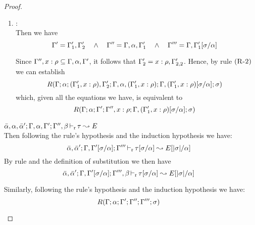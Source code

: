 \begin{proof}
\begin{description}
\begin{enumerate}
  \item {}: \\
   Then we have
\begin{equation*}
  \Gamma' = \Gamma_1',\Gamma_2'  \quad\wedge\quad \Gamma'' = \Gamma,\alpha,\Gamma_1' \quad\wedge\quad 
      \Gamma''' = \Gamma,\Gamma_1'[\sigma/\alpha]
\end{equation*}

  Since $\Gamma'',x:\rho \subseteq \Gamma,\alpha,\Gamma'$, it follows that $\Gamma_2' = x:\rho,\Gamma_{2,2}'$.
  Hence, by rule $\mbox{({\tt\sc R-2})}$ we can establish
\begin{equation*}
R(\Gamma;\alpha;(\Gamma_1',x:\rho),\Gamma_2';\Gamma,\alpha,(\Gamma_1',x:\rho);\Gamma,(\Gamma_1',x:\rho)[\sigma/\alpha];\sigma)
\end{equation*}
        which, given all the equations we have, is equivalent to
\begin{equation*}
R(\Gamma;\alpha;\Gamma';\Gamma'',x:\rho;\Gamma,(\Gamma_1',x:\rho)[\sigma/\alpha];\sigma)
\end{equation*}
  \end{enumerate}


\item[\fbox{\texttt{(L-TyVar)}}]\quad$\bar{\alpha},\alpha,\bar{\alpha}';\Gamma,\alpha,\Gamma';\Gamma'',\beta \mathop{\vdash_{\mathrm{r}}} \tau \leadsto E$ \ \\
  Then following the rule's hypothesis and the induction hypothesis we have:
\begin{equation*}
  \bar{\alpha},\bar{\alpha}';\Gamma,\Gamma'[\sigma/\alpha];\Gamma''' \mathop{\vdash_{\mathrm{r}}} \tau[\sigma/\alpha] \leadsto E[|\sigma|/\alpha]
\end{equation*}
  By rule  and the definition of substitution we then have
\begin{equation*}
  \bar{\alpha},\bar{\alpha}';\Gamma,\Gamma'[\sigma/\alpha];\Gamma''',\beta \mathop{\vdash_{\mathrm{r}}} \tau[\sigma/\alpha] \leadsto E[|\sigma|/\alpha]
\end{equation*}

  Similarly, following the rule's hypothesis and the induction hypothesis we have:
\begin{equation*}
  R(\Gamma;\alpha;\Gamma';\Gamma'';\Gamma''';\sigma)
\end{equation*}


\end{description}
\end{proof}
